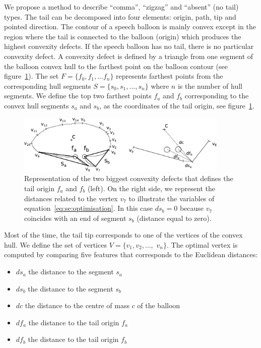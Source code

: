 We propose a method to describe ``comma'', ``zigzag'' and ``absent'' (no tail) types.
The tail can be decomposed into four elements: origin, path, tip and pointed direction.
The contour of a speech balloon is mainly convex except in the region where the tail is connected to the balloon (origin) which produces the highest convexity defects.
If the speech balloon has no tail, there is no particular convexity defect.
A convexity defect is defined by a triangle from one segment of the balloon convex hull to the farthest point on the balloon contour (see figure~\ref{fig:se:convexity_defects}).
The set $F=\{f_0,f_1,...f_n\}$ represents farthest points from the corresponding hull segments $S=\{s_0, s_1,...,s_n\}$ where $n$ is the number of hull segments.
We define the top two farthest points $f_a$ and $f_b$ corresponding to the convex hull segments $s_a$ and $s_b$, as the coordinates of the tail origin, see figure~\ref{fig:se:convexity_defects}.

    \begin{figure}[ht]%
      \centering
      \includegraphics[width=0.9\textwidth]{tail_description.pdf}
    \caption{Representation of the two biggest convexity defects that defines the tail origin $f_a$ and $f_b$ (left). On the right side, we represent the distances related to the vertex $v_7$ to illustrate the variables of equation~\ref{eq:se:optimisation}. In this case $ds_b=0$ because $v_7$ coincides with an end of segment $s_b$ (distance equal to zero).}
    \label{fig:se:convexity_defects}
    \end{figure}

Most of the time, the tail tip corresponds to one of the vertices of the convex hull.
We define the set of vertices $V=\{v_1,v_2,...,$ $v_n\}$.
The optimal vertex is computed by comparing five features that corresponds to the Euclidean distances:

\begin{itemize}
   \item $ds_a$ the distance to the segment $s_a$
   \item $ds_b$ the distance to the segment $s_b$
   \item $dc$ the distance to the centre of mass $c$ of the balloon
   \item $df_a$ the distance to the tail origin $f_a$
   \item $df_b$ the distance to the tail origin $f_b$
 \end{itemize} 

